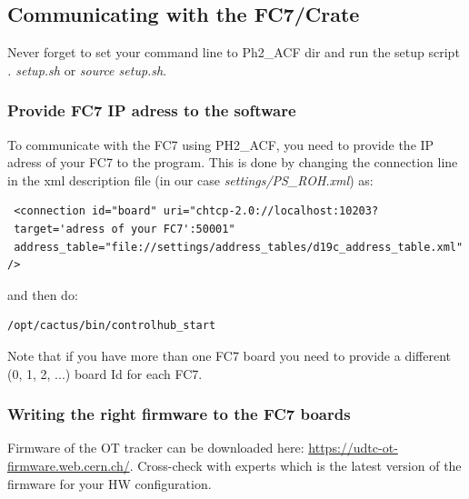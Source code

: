 \documentclass[10pt,a4paper]{article}
\begin{document}
\subsection{Communicating with the FC7/Crate}

Never forget to set your command line to Ph2\_ACF dir and run the setup script \emph{. setup.sh} or \emph{source setup.sh}.

\subsubsection{Provide FC7 IP adress to the software}
To communicate with the FC7 using PH2\_ACF, you need to provide the IP adress of your FC7 to the program. This is done by changing the connection line in the xml description file (in our case \emph{settings/PS\_ROH.xml}) as:

\begin{framed}
\begin{verbatim}
 <connection id="board" uri="chtcp-2.0://localhost:10203?
 target='adress of your FC7':50001" 
 address_table="file://settings/address_tables/d19c_address_table.xml" />
\end{verbatim}
\end{framed}

and then do:
\begin{framed}
\begin{verbatim}
/opt/cactus/bin/controlhub_start
\end{verbatim}
\end{framed}

Note that if you have more than one FC7 board you need to provide a different (0, 1, 2, ...) board Id for each FC7.

\subsubsection{Writing the right firmware to the FC7 boards}
Firmware of the OT tracker can be downloaded here: \url{https://udtc-ot-firmware.web.cern.ch/}.
Cross-check with experts which is the latest version of the firmware for your HW configuration.
\end{document}
